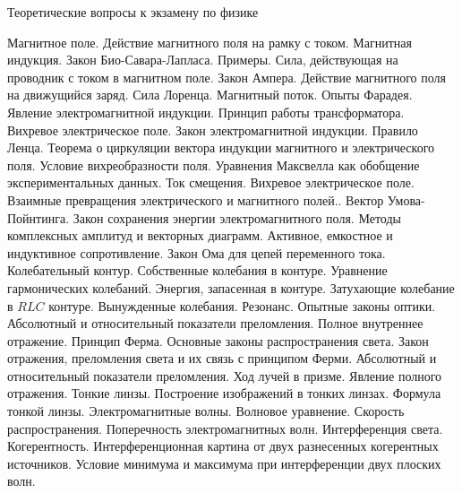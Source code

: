 \documentclass[a4paper]{exam}
\begin{document}
\firstpageheadrule
\begin{center}
	Теоретические вопросы к экзамену по физике
\end{center}
\begin{questions}
\question Магнитное поле. Действие магнитного поля на рамку с током. Магнитная индукция. Закон Био-Савара-Лапласа. Примеры.
\question Сила, действующая на проводник с током в магнитном поле. Закон Ампера. Действие магнитного поля на движущийся заряд. Сила Лоренца.
\question Магнитный поток. Опыты Фарадея. Явление электромагнитной индукции. Принцип работы трансформатора. Вихревое электрическое поле. Закон электромагнитной индукции. Правило Ленца.
\question Теорема о циркуляции вектора индукции магнитного и электрического поля. Условие вихреобразности поля.
\question Уравнения Максвелла как обобщение экспериментальных данных. Ток смещения. Вихревое электрическое поле. Взаимные превращения электрического и магнитного полей..
\question Вектор Умова-Пойнтинга. Закон сохранения энергии электромагнитного поля.
\question  Методы комплексных амплитуд и векторных диаграмм. Активное, емкостное и индуктивное сопротивление. Закон Ома для цепей переменного тока.
\question Колебательный контур. Собственные колебания в контуре. Уравнение гармонических колебаний. Энергия, запасенная в контуре. 
\question Затухающие колебание в $RLC$ контуре. 
\question Вынужденные колебания. Резонанс.
\question Опытные законы оптики. Абсолютный и относительный показатели преломления. Полное внутреннее отражение. 
\question Принцип Ферма. Основные законы распространения света.
\question Закон отражения, преломления света и их связь с принципом Ферми. Абсолютный и относительный показатели преломления. Ход лучей в призме. Явление полного отражения.
\question Тонкие линзы. Построение изображений в тонких линзах. Формула тонкой линзы.
\question Электромагнитные волны. Волновое уравнение. Скорость распространения. Поперечность электромагнитных волн. 
\question Интерференция света. Когерентность. 
\question Интерференционная картина от двух разнесенных когерентных источников.
\question Условие минимума и максимума при интерференции двух плоских волн.
\end{questions}
\end{document}
